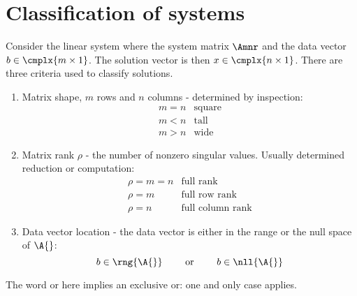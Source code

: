 \section{Classification of systems}
Consider the linear system where the system matrix $\Amnr$ and the data vector $b\in\cmplx{m\times 1}$. The solution vector is then $x\in\cmplx{n\times 1}$. There are three criteria used to classify solutions.
\begin{enumerate}
\item Matrix shape, $m$ rows and $n$ columns - determined by inspection:
\begin{equation*}
  \begin{array}{ll}
    m=n & \text{square} \\
    m<n & \text{tall} \\
    m>n & \text{wide}
  \end{array}
\end{equation*}
\item Matrix rank $\rho$ - the number of nonzero singular values. Usually determined reduction or computation:
\begin{equation*}
  \begin{array}{ll}
    \rho = m = n & \text{full rank} \\
    \rho = m & \text{full row rank} \\
    \rho = n & \text{full column rank}
  \end{array}
\end{equation*}
\item Data vector location - the data vector is either in the range or the null space of $\A{}$:
\begin{equation*}
  b\in\rng{\A{}} \qquad \text{ or } \qquad b\in\nll{\A{}}
\end{equation*}
\end{enumerate}
The word or here implies an exclusive or: one and only case applies.


%


\endinput